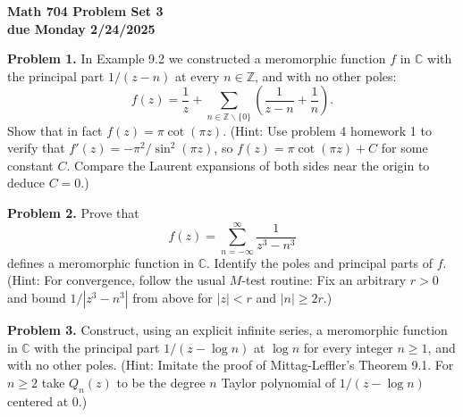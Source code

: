 \documentclass[12pt]{amsart}
\newcommand{\sm}{\smallsetminus}
\newcommand{\CC}{{\mathbb C}}
\newcommand{\ZZ}{{\mathbb Z}}
\newcommand{\vs}{\vspace{2mm}}
\begin{document}
\begin{center}
{\bf \large Math 704 Problem Set 3} \vs \\
{\bf due Monday 2/24/2025} \vs \vs
\end{center}

\noindent
{\bf Problem 1.} In Example 9.2 we constructed a meromorphic function $f$ in $\CC$ with the principal part $1/(z-n)$ at every $n \in \ZZ$, and with no other poles:
$$
f(z) = \frac{1}{z} + \sum_{n \in \ZZ \sm \{ 0 \}} \left(  \frac{1}{z-n} +\frac{1}{n} \right).
$$
Show that in fact $f(z)=\pi \cot(\pi z)$. (Hint: Use problem 4 homework 1  to verify that $f'(z)=-\pi^2/\sin^2(\pi z)$, so $f(z)=\pi \cot(\pi z)+C$ for some constant $C$. Compare the Laurent expansions of both sides near the origin to deduce $C=0$.)\vs

\noindent
{\bf Problem 2.} Prove that
$$
f(z)=\sum_{n=-\infty}^{\infty} \frac{1}{z^3-n^3}
$$
defines a meromorphic function in $\CC$. Identify the poles and principal parts of $f$. (Hint: For convergence, follow the usual $M$-test routine: Fix an arbitrary $r>0$ and bound $1/|z^3-n^3|$ from above for $|z|<r$ and $|n| \geq 2r$.) \vs 

\noindent
{\bf Problem 3.} Construct, using an explicit infinite series, a meromorphic function in $\CC$ with the principal part $1/(z-\log n)$ at $\log n$ for every integer $n \geq 1$, and with no other poles. (Hint: Imitate the proof of Mittag-Leffler's Theorem 9.1. For $n \geq 2$ take $Q_n(z)$ to be the degree $n$ Taylor polynomial of $1/(z-\log n)$ centered at $0$.)  
\end{document}
